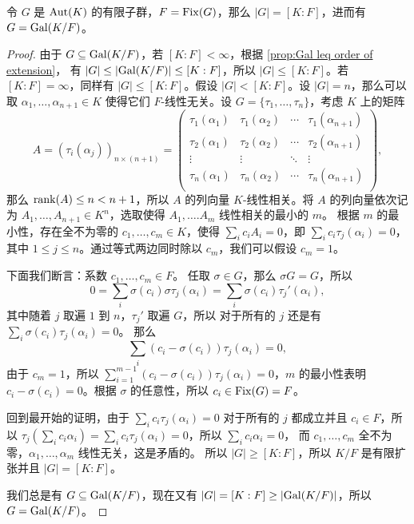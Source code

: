 \begin{proposition}\label{prop:when Gal equal to K/F}
  令 $G$ 是 $\operatorname{Aut}(K)$ 的有限子群，$F=\operatorname{Fix}(G)$，那么 $|G|=[K:F]$，进而有 $G=\operatorname{Gal}(K/F)$。
\end{proposition}
\begin{proof}
  由于 $G\subseteq \operatorname{Gal}(K/F)$，若 $[K:F]<\infty$，根据 \autoref{prop:Gal leq order of extension}，
  有 $|G|\leq \lvert\operatorname{Gal}(K/F)\rvert\leq [K:F]$，所以 $|G|\leq [K:F]$。若 $[K:F]=\infty$，同样有
  $|G|\leq [K:F]$。假设 $|G|<[K:F]$。设 $|G|=n$，那么可以取 $\alpha_1,\dots,\alpha_{n+1}\in K$
  使得它们 $F$-线性无关。设 $G=\{\tau_1,\dots,\tau_n\}$，考虑 $K$ 上的矩阵
  \[
    A=(\tau_i(\alpha_j))_{n\times (n+1)}=\begin{pmatrix}
      \tau_1(\alpha_1) & \tau_1(\alpha_2) & \cdots & \tau_1(\alpha_{n+1}) \\
      \tau_2(\alpha_1) & \tau_2(\alpha_2) & \cdots & \tau_2(\alpha_{n+1}) \\
      \vdots & \vdots & \ddots & \vdots \\
      \tau_{n}(\alpha_1) & \tau_n(\alpha_2) & \cdots & \tau_n(\alpha_{n+1}) \\
    \end{pmatrix}  ,
  \]
  那么 $\operatorname{rank}(A)\leq n<n+1$，所以 $A$ 的列向量 $K$-线性相关。将 $A$ 的列向量依次记为
  $A_1,\dots,A_{n+1}\in K^n$，选取使得 $A_1,\dots.A_m$ 线性相关的最小的 $m$。
  根据 $m$ 的最小性，存在全不为零的 $c_1,\dots,c_m\in K$，使得 $\sum_i c_iA_i=0$，即
  $\sum_i c_i\tau_j(\alpha_i)=0$，其中 $1\leq j\leq n$。通过等式两边同时除以 $c_m$，我们可以假设
  $c_m=1$。
  
  下面我们断言：系数 $c_1,\dots,c_m\in F$。
  任取 $\sigma\in G$，那么 $\sigma G=G$，所以
  \[
    0=\sum_i \sigma(c_i)\sigma\tau_j(\alpha_i)=\sum_i\sigma(c_i)\tau_j'(\alpha_i),
  \]
  其中随着 $j$ 取遍 $1$ 到 $n$，$\tau_j'$ 取遍 $G$，所以
  对于所有的 $j$ 还是有 $\sum_i\sigma(c_i)\tau_j(\alpha_i)=0$。
  那么
  \[
    \sum_i(c_i-\sigma(c_i))\tau_j(\alpha_i)=0,  
  \]
  由于 $c_m=1$，所以 $\sum_{i=1}^{m-1}(c_i-\sigma(c_i))\tau_j(\alpha_i)=0$，$m$
  的最小性表明 $c_i-\sigma(c_i)=0$。根据 $\sigma$ 的任意性，所以 $c_i\in\operatorname{Fix}(G)=F$。
  
  回到最开始的证明，由于 $\sum_i c_i\tau_j(\alpha_i)=0$ 对于所有的 $j$ 都成立并且 $c_i\in F$，所以
  $\tau_j(\sum_i c_i\alpha_i)=\sum_i c_i\tau_j(\alpha_i)=0$，所以 $\sum_i c_i\alpha_i=0$，
  而 $c_1,\dots,c_m$ 全不为零，$\alpha_1,\dots,\alpha_m$ 线性无关，这是矛盾的。
  所以 $|G|\geq [K:F]$，所以 $K/F$ 是有限扩张并且 $|G|=[K:F]$。

  我们总是有 $G\subseteq \operatorname{Gal}(K/F)$，现在又有 $|G|=[K:F]\geq \lvert\operatorname{Gal}(K/F)\rvert$，所以
  $G=\operatorname{Gal}(K/F)$。
\end{proof}

